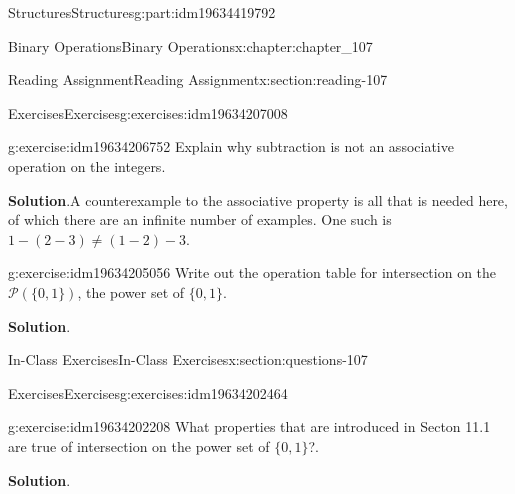 \documentclass[oneside,10pt,]{book}
\newcommand{\blocktitlefont}{\relax}
\numberwithin{equation}{section}
\begin{document}
\begin{partptx}{Structures}{}{Structures}{}{}{g:part:idm19634419792}
\begin{chapterptx}{Binary Operations}{}{Binary Operations}{}{}{x:chapter:chapter_107}
\begin{sectionptx}{Reading Assignment}{}{Reading Assignment}{}{}{x:section:reading-107}
%
\begin{exercises-subsection-numberless}{Exercises}{}{Exercises}{}{}{g:exercises:idm19634207008}
\par\medskip\noindent%
%
\begin{exercisegroup}
\begin{divisionexerciseeg}{1}{}{}{g:exercise:idm19634206752}%
Explain why subtraction is not an associative operation on the integers.%
\par\smallskip%
\noindent\textbf{\blocktitlefont Solution}.\hypertarget{g:solution:idm19634206624}{}\quad{}A counterexample to the associative property is all that is needed here, of which there are an infinite number of examples.  One such is \(1-(2-3)\neq (1-2)-3\).%
\end{divisionexerciseeg}%
\begin{divisionexerciseeg}{2}{}{}{g:exercise:idm19634205056}%
Write out the operation table for intersection on the \(\mathcal{P}(\{0,1\})\), the power set of \(\{0,1\}\).%
\par\smallskip%
\noindent\textbf{\blocktitlefont Solution}.\hypertarget{g:solution:idm19634203456}{}\quad{}%
\end{divisionexerciseeg}%
\end{exercisegroup}
\par\medskip\noindent
\end{exercises-subsection-numberless}
\end{sectionptx}
%
%
\typeout{************************************************}
\typeout{************************************************}
%
\begin{sectionptx}{In-Class Exercises}{}{In-Class Exercises}{}{}{x:section:questions-107}
%
%
%
\typeout{************************************************}
\typeout{************************************************}
%
\begin{exercises-subsection-numberless}{Exercises}{}{Exercises}{}{}{g:exercises:idm19634202464}
\par\medskip\noindent%
%
\begin{exercisegroup}
\begin{divisionexerciseeg}{1}{}{}{g:exercise:idm19634202208}%
What properties that are introduced in Secton 11.1 are true of intersection on the power set of \(\{0,1\}\)?.%
\par\smallskip%
\noindent\textbf{\blocktitlefont Solution}.\hypertarget{g:solution:idm19634200960}{}\quad{}%
\end{divisionexerciseeg}%

\end{exercisegroup}
\end{exercises-subsection-numberless}
\end{sectionptx}
\end{chapterptx}
\end{partptx}
\end{document}
